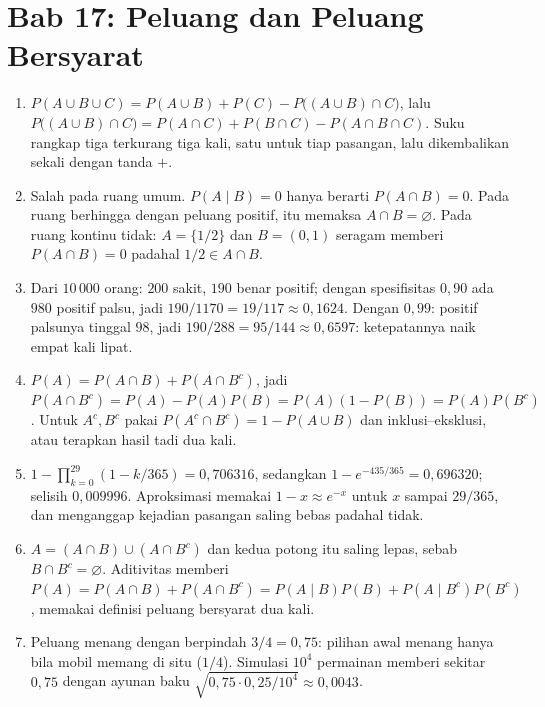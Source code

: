 \section*{Bab 17: Peluang dan Peluang Bersyarat}
\begin{enumerate}[label=\textbf{17.\arabic*}]
  \item 
$P(A\cup B\cup C)=P(A\cup B)+P(C)-P\bigl((A\cup B)\cap C\bigr)$, lalu
        $P\bigl((A\cup B)\cap C\bigr)=P(A\cap C)+P(B\cap C)-P(A\cap B\cap C)$. Suku
        rangkap tiga terkurang tiga kali, satu untuk tiap pasangan, lalu
        dikembalikan sekali dengan tanda $+$.

  \item Salah pada ruang umum. $P(A\mid B)=0$ hanya berarti $P(A\cap B)=0$. Pada
        ruang berhingga dengan peluang positif, itu memaksa $A\cap B=\varnothing$.
        Pada ruang kontinu tidak: $A=\{1/2\}$ dan $B=(0,1)$ seragam memberi
        $P(A\cap B)=0$ padahal $1/2\in A\cap B$.

  \item Dari $10\,000$ orang: $200$ sakit, $190$ benar positif; dengan spesifisitas
        $0{,}90$ ada $980$ positif palsu, jadi $190/1170=19/117\approx0{,}1624$.
        Dengan $0{,}99$: positif palsunya tinggal $98$, jadi $190/288=95/144
        \approx0{,}6597$: ketepatannya naik empat kali lipat.

  \item $P(A)=P(A\cap B)+P(A\cap B^{c})$, jadi
        $P(A\cap B^{c})=P(A)-P(A)P(B)=P(A)(1-P(B))=P(A)P(B^{c})$. Untuk
        $A^{c},B^{c}$ pakai $P(A^{c}\cap B^{c})=1-P(A\cup B)$ dan inklusi--eksklusi,
        atau terapkan hasil tadi dua kali.

  \item $1-\prod_{k=0}^{29}(1-k/365)=0{,}706316$, sedangkan
        $1-e^{-435/365}=0{,}696320$; selisih $0{,}009996$. Aproksimasi memakai
        $1-x\approx e^{-x}$ untuk $x$ sampai $29/365$, dan menganggap kejadian
        pasangan saling bebas padahal tidak.

  \item $A=(A\cap B)\cup(A\cap B^{c})$ dan kedua potong itu saling lepas, sebab
        $B\cap B^{c}=\varnothing$. Aditivitas memberi
        $P(A)=P(A\cap B)+P(A\cap B^{c})=P(A\mid B)P(B)+P(A\mid B^{c})P(B^{c})$,
        memakai definisi peluang bersyarat dua kali.

  \item Peluang menang dengan berpindah $3/4=0{,}75$: pilihan awal menang hanya bila
        mobil memang di situ ($1/4$). Simulasi $10^{4}$ permainan memberi sekitar
        $0{,}75$ dengan ayunan baku $\sqrt{0{,}75\cdot0{,}25/10^{4}}\approx0{,}0043$.


\end{enumerate}
